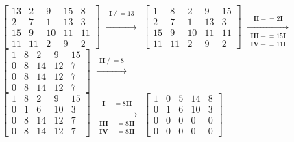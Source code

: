 \documentclass{article}
\newcommand{\ds}{\displaystyle}
\begin{document}
  \noindent
  $\ds \left[\begin{matrix}13 & 2 & 9 & 15 & 8\\2 & 7 & 1 & 13 & 3\\15 & 9 & 10 & 11 & 11\\11 & 11 & 2 & 9 & 2\end{matrix}\right] $
  $\ds \xrightarrow[\begin{matrix}  \\  \end{matrix}]{\begin{matrix} \textbf{I} \mathrel{/}= 13 \\  \end{matrix}} $
  $\ds \left[\begin{matrix}1 & 8 & 2 & 9 & 15\\2 & 7 & 1 & 13 & 3\\15 & 9 & 10 & 11 & 11\\11 & 11 & 2 & 9 & 2\end{matrix}\right] $
  $\ds \xrightarrow[\begin{matrix} \textbf{III} \mathrel{-}= 15 \textbf{I} \\ \textbf{IV} \mathrel{-}= 11 \textbf{I} \end{matrix}]{\begin{matrix}  \\ \textbf{II} \mathrel{-}= 2 \textbf{I} \end{matrix}} $
  $\ds \left[\begin{matrix}1 & 8 & 2 & 9 & 15\\0 & 8 & 14 & 12 & 7\\0 & 8 & 14 & 12 & 7\\0 & 8 & 14 & 12 & 7\end{matrix}\right] $
  $\ds \xrightarrow[\begin{matrix}  \\  \end{matrix}]{\begin{matrix}  \\ \textbf{II} \mathrel{/}= 8 \end{matrix}} $ \\
  $\ds \left[\begin{matrix}1 & 8 & 2 & 9 & 15\\0 & 1 & 6 & 10 & 3\\0 & 8 & 14 & 12 & 7\\0 & 8 & 14 & 12 & 7\end{matrix}\right] $
  $\ds \xrightarrow[\begin{matrix} \textbf{III} \mathrel{-}= 8 \textbf{II} \\ \textbf{IV} \mathrel{-}= 8 \textbf{II} \end{matrix}]{\begin{matrix} \textbf{I} \mathrel{-}= 8 \textbf{II} \\  \end{matrix}} $
  $\ds \left[\begin{matrix}1 & 0 & 5 & 14 & 8\\0 & 1 & 6 & 10 & 3\\0 & 0 & 0 & 0 & 0\\0 & 0 & 0 & 0 & 0\end{matrix}\right] $
\end{document}

